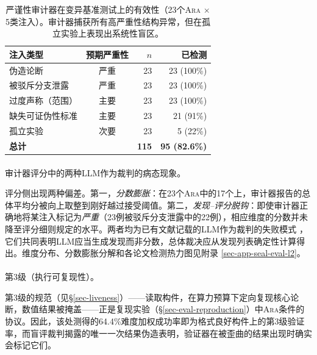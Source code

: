 \documentclass[
]{article}
\makeatletter
\let\oldparagraph\paragraph
\renewcommand{\paragraph}{
    \@ifstar
      \xxxParagraphStar
      \xxxParagraphNoStar
  }
\newcommand{\xxxParagraphStar}[1]{\oldparagraph*{#1}\mbox{}}
\newcommand{\xxxParagraphNoStar}[1]{\oldparagraph{#1}\mbox{}}
\theoremstyle{definition}
\newcommand{\ara}{\textsc{Ara}}
\makeatother
\begin{document}
\begin{table}[htbp]
\centering
\small
\begin{tabular}{lcrr}
\toprule
\textbf{注入类型} & \textbf{预期严重性} & \textbf{\(n\)} & \textbf{已检测} \\
\midrule
伪造论断 & 严重 & 23 & 23 (100\%) \\
被驳斥分支泄露 & 严重 & 23 & 23 (100\%) \\
过度声称（范围） & 主要 & 23 & 23 (100\%) \\
缺失可证伪性标准 & 主要 & 23 & 21 (91\%) \\
孤立实验 & 次要 & 23 & 5 (22\%) \\
\textbf{总计} &  & \textbf{115} & \textbf{95 (82.6\%)} \\
\bottomrule
\end{tabular}
\caption[严谨性审计器在变异基准测试上的有效性]{严谨性审计器在变异基准测试上的有效性（23个\ara{} \(\times\) 5类注入）。审计器捕获所有高严重性结构异常，但在孤立实验上表现出系统性盲区。}
\label{tbl-seal-l2}
\end{table}

\paragraph{审计器评分中的两种LLM作为裁判的病态现象。}\label{ux5ba1ux8ba1ux5668ux8bc4ux5206ux4e2dux7684ux4e24ux79cdllmux4f5cux4e3aux88c1ux5224ux7684ux75c5ux6001ux73b0ux8c61}

评分侧出现两种偏差。第一，\emph{分数膨胀}：在23个\ara{}中的17个上，审计器报告的总体平均分被向上取整到刚好越过接受阈值。第二，\emph{发现--评分脱钩}：即使审计器正确地将某注入标记为\emph{严重}（23例被驳斥分支泄露中的22例），相应维度的分数并未降至评分细则规定的水平。两者均为已有文献记载的LLM作为裁判的失败模式
\citep{zheng2023judging}，它们共同表明LLM应当生成发现而非分数，总体裁决应从发现列表确定性计算得出。维度分布、分数膨胀分解和各论文检测热力图见附录
\ref{sec-app-seal-eval-l2}。

\paragraph{第3级（执行可复现性）。}\label{ux7b2c3ux7ea7ux6267ux884cux53efux590dux73b0ux6027}

第3级的规范（见\S\ref{sec-liveness}）------读取构件，在算力预算下定向复现核心论断，数值结果被掩盖------正是复现实验（\S\ref{sec-eval-reproduction}）中\ara{}条件的协议。因此，该处测得的64.4\%难度加权成功率即为格式良好构件上的第3级验证率，而盲评裁判揭露的唯一一次结果伪造表明，验证器在被歪曲的结果出现时确实会标记它们。
\end{document}
